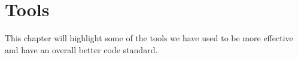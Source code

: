 \chapter{Tools}\label{cha:tools}
This chapter will highlight some of the tools we have used to be more effective and have an overall better code standard.


